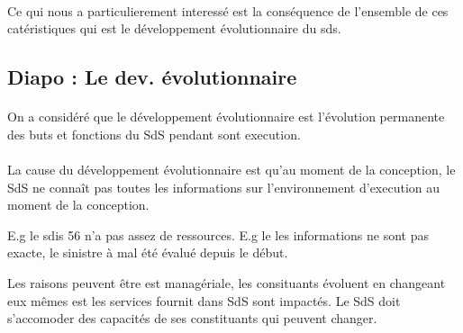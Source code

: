 



\paragraph{}
Ce qui nous a
particulierement interessé est la conséquence de l'ensemble de ces
catéristiques qui est le développement évolutionnaire du sds. 


\subsection{Diapo : Le dev. évolutionnaire}
\paragraph{}
On a considéré que le développement évolutionnaire est l'évolution
permanente des buts et fonctions du SdS pendant sont execution. 

\paragraph{} 
La cause du développement évolutionnaire est qu'au moment de la
conception, le SdS ne connaît pas toutes les informations sur
l'environnement d'execution au moment de la conception. 

E.g le sdis 56 n'a pas assez de ressources. E.g le les informations ne
sont pas exacte, le sinistre à mal été évalué depuis le début.  

Les raisons peuvent être est managériale, les consituants évoluent en
changeant eux mêmes est les services fournit dans SdS sont impactés.
Le SdS doit s'accomoder des capacités de ses constituants qui peuvent
changer.  

